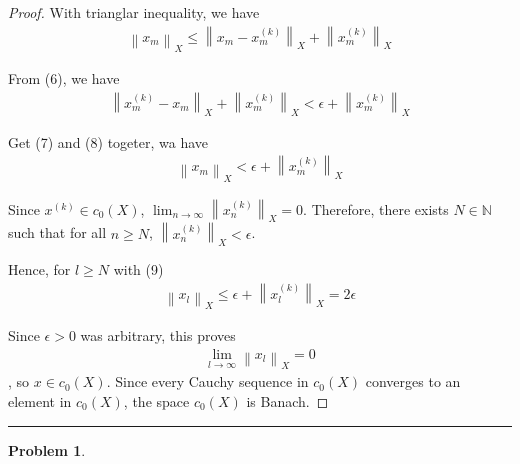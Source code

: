 \documentclass{article}
\newcommand{\norm}[1]{\left\|#1\right\|}
\newcommand{\N}{\mathbb{N}}
\newtheorem{problem}{Problem}
\begin{document}
\begin{proof}
With trianglar inequality, we have
\begin{gather}
\norm{x_m}_{X} 
\leq \norm{x_m - x_m^{(k)}}_{X} + \norm{x_m^{(k)}}_{X}
\end{gather}

From (6), we have
\begin{gather}
\norm{x_m^{(k)} - x_m}_X + \norm{x_m^{(k)}}_{X} 
< \epsilon + \norm{x_m^{(k)}}_{X}
\end{gather}

Get (7) and (8) togeter, wa have
\begin{gather}
\norm{x_m}_{X}
< \epsilon + \norm{x_m^{(k)}}_{X}
\end{gather}

Since $x^{(k)} \in c_0(X)$, $\lim_{n\to\infty} \norm{x_n^{(k)}}_{X} = 0$. 
Therefore, there exists $N \in \N$ such that for all $n \geq N$, $\norm{x_n^{(k)}}_{X} < \epsilon$.

Hence, for $l \geq N$ with (9)
\begin{gather}
\norm{x_l}_{X} 
\leq \epsilon + \norm{x_l^{(k)}}_{X} 
= 2\epsilon
\end{gather}

Since $\epsilon > 0$ was arbitrary, this proves 
\begin{gather}
\lim_{l\to\infty} \norm{x_l}_{X} = 0
\end{gather}
, so $x \in c_0(X)$.
Since every Cauchy sequence in $c_0(X)$ converges to an element in $c_0(X)$, the space $c_0(X)$ is Banach.
\end{proof}

\hrule
\vspace{0.5em}


\begin{problem}
\end{problem}
\end{document}

